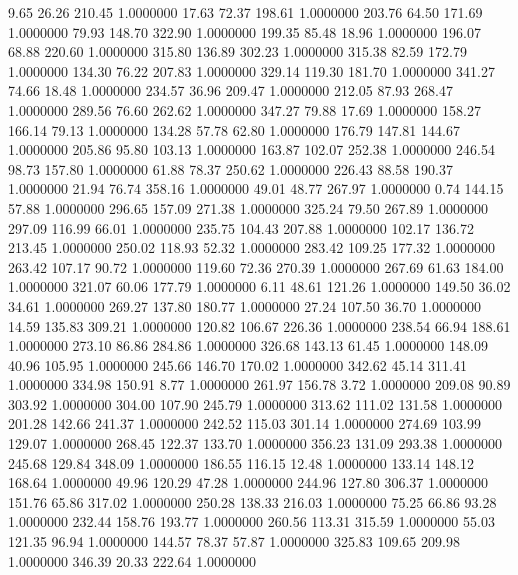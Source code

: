    9.65   26.26  210.45   1.0000000
  17.63   72.37  198.61   1.0000000
 203.76   64.50  171.69   1.0000000
  79.93  148.70  322.90   1.0000000
 199.35   85.48   18.96   1.0000000
 196.07   68.88  220.60   1.0000000
 315.80  136.89  302.23   1.0000000
 315.38   82.59  172.79   1.0000000
 134.30   76.22  207.83   1.0000000
 329.14  119.30  181.70   1.0000000
 341.27   74.66   18.48   1.0000000
 234.57   36.96  209.47   1.0000000
 212.05   87.93  268.47   1.0000000
 289.56   76.60  262.62   1.0000000
 347.27   79.88   17.69   1.0000000
 158.27  166.14   79.13   1.0000000
 134.28   57.78   62.80   1.0000000
 176.79  147.81  144.67   1.0000000
 205.86   95.80  103.13   1.0000000
 163.87  102.07  252.38   1.0000000
 246.54   98.73  157.80   1.0000000
  61.88   78.37  250.62   1.0000000
 226.43   88.58  190.37   1.0000000
  21.94   76.74  358.16   1.0000000
  49.01   48.77  267.97   1.0000000
   0.74  144.15   57.88   1.0000000
 296.65  157.09  271.38   1.0000000
 325.24   79.50  267.89   1.0000000
 297.09  116.99   66.01   1.0000000
 235.75  104.43  207.88   1.0000000
 102.17  136.72  213.45   1.0000000
 250.02  118.93   52.32   1.0000000
 283.42  109.25  177.32   1.0000000
 263.42  107.17   90.72   1.0000000
 119.60   72.36  270.39   1.0000000
 267.69   61.63  184.00   1.0000000
 321.07   60.06  177.79   1.0000000
   6.11   48.61  121.26   1.0000000
 149.50   36.02   34.61   1.0000000
 269.27  137.80  180.77   1.0000000
  27.24  107.50   36.70   1.0000000
  14.59  135.83  309.21   1.0000000
 120.82  106.67  226.36   1.0000000
 238.54   66.94  188.61   1.0000000
 273.10   86.86  284.86   1.0000000
 326.68  143.13   61.45   1.0000000
 148.09   40.96  105.95   1.0000000
 245.66  146.70  170.02   1.0000000
 342.62   45.14  311.41   1.0000000
 334.98  150.91    8.77   1.0000000
 261.97  156.78    3.72   1.0000000
 209.08   90.89  303.92   1.0000000
 304.00  107.90  245.79   1.0000000
 313.62  111.02  131.58   1.0000000
 201.28  142.66  241.37   1.0000000
 242.52  115.03  301.14   1.0000000
 274.69  103.99  129.07   1.0000000
 268.45  122.37  133.70   1.0000000
 356.23  131.09  293.38   1.0000000
 245.68  129.84  348.09   1.0000000
 186.55  116.15   12.48   1.0000000
 133.14  148.12  168.64   1.0000000
  49.96  120.29   47.28   1.0000000
 244.96  127.80  306.37   1.0000000
 151.76   65.86  317.02   1.0000000
 250.28  138.33  216.03   1.0000000
  75.25   66.86   93.28   1.0000000
 232.44  158.76  193.77   1.0000000
 260.56  113.31  315.59   1.0000000
  55.03  121.35   96.94   1.0000000
 144.57   78.37   57.87   1.0000000
 325.83  109.65  209.98   1.0000000
 346.39   20.33  222.64   1.0000000

